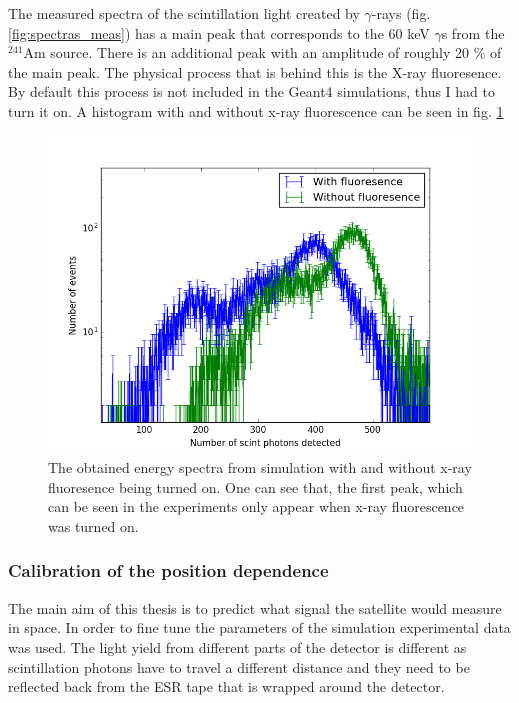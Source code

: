 \documentclass[12pt, a4paper,titlepage]{article}
\numberwithin{equation}{section}
\numberwithin{figure}{section}
\begin{document}
The measured spectra of the scintillation light created by $\gamma$-rays (fig. \ref{fig:spectras_meas}) has a main peak that corresponds to the 60 keV $\gamma$s from the $^{241}$Am source. There is an additional peak with an amplitude of roughly 20 \% of the main peak. The physical process that is behind this is the X-ray fluoresence. By default this process is not included in the Geant4 simulations, thus I had to turn it on. A histogram with and without x-ray fluorescence can be seen in fig. \ref{fig:fluo}

\begin{figure}[h!]
\centering
\includegraphics[width=140.0mm]{images/fluovsnofluo.png}
\caption{The obtained energy spectra from simulation with and without x-ray fluoresence being turned on. One can see that, the first peak, which can be seen in the experiments only appear when x-ray fluorescence was turned on.}
\label{fig:fluo}
\end{figure}

\pagebreak

\subsubsection{Calibration of the position dependence}

The main aim of this thesis is to predict what signal the satellite would measure in space. In order to fine tune the parameters of the simulation experimental data was used. The light yield from different parts of the detector is different as scintillation photons have to travel a different distance and they need to be reflected back from the ESR tape that is wrapped around the detector.
\end{document}
